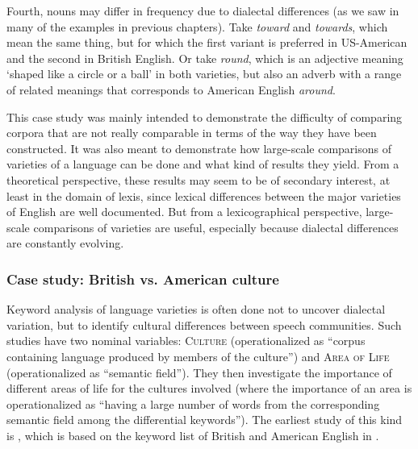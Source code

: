 Fourth, nouns  may differ in frequency  due to dialectal differences (as we saw in many of the examples in previous chapters). Take \textit{toward} and \textit{towards}, which mean the same thing, but for which the first variant is preferred in US\hyp{}American  and the second in British  English. Or take \textit{round}, which is an adjective  meaning `shaped like a circle or a ball' in both varieties,  but also an adverb  with a range of related meanings that corresponds to American English \textit{around}.

This case study was mainly intended to demonstrate the difficulty of comparing corpora that are not really comparable in terms of the way they have been constructed. It was also meant to demonstrate how large\hyp{}scale comparisons of varieties  of a language can be done and what kind of results they yield. From a theoretical perspective, these results may seem to be of secondary interest, at least in the domain of lexis, since lexical differences between the major varieties of English are well documented. But from a lexicographical perspective, large\hyp{}scale comparisons of varieties  are useful, especially because dialectal differences are constantly evolving.

\subsubsection{Case study: British vs. American culture}
\label{sec:britishvsamericanculture}

Keyword  analysis of language varieties  is often done not to uncover dialectal variation,  but to identify cultural  differences between speech communities. Such studies have two nominal  variables: \textsc{Culture} (operationalized  as ``corpus containing language produced by members of the culture'') and \textsc{Area of Life} (operationalized as ``semantic field''). They then investigate the importance of different areas of life for the cultures  involved (where the importance of an area is operationalized  as ``having a large number of words from the corresponding semantic  field among the differential keywords'').  The earliest study of this kind is \citet{leech_computer_1992}, which is based on the keyword list of British  and American  English in \citet{johansson_frequency_1989}.

